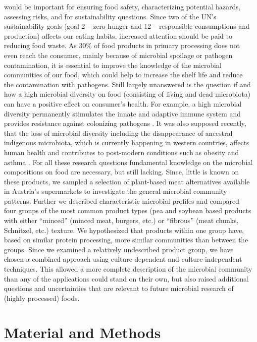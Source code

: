 \documentclass[preprint, 3p,
authoryear]{elsarticle} %
\begin{document}
would be important for ensuring food safety, characterizing potential
hazards, assessing risks, and for sustainability questions. Since two of
the UN's sustainability goals (goal 2 -- zero hunger and 12 --
responsible consumptions and production) affects our eating habits,
increased attention should be paid to reducing food waste. As 30\% of
food products in primary processing does not even reach the consumer,
mainly because of microbial spoilage or pathogen contamination, it is
essential to improve the knowledge of the microbial communities of our
food, which could help to increase the shelf life and reduce the
contamination with pathogens. Still largely unanswered is the question
if and how a high microbial diversity on food (consisting of living and
dead microbiota) can have a positive effect on consumer's health. For
example, a high microbial diversity permanently stimulates the innate
and adaptive immune system and provides resistance against colonizing
pathogens \citep[\citet{Mackowiak.1982},
\citet{Smith.2007}]{Crowe.1973}. It was also supposed recently, that the
loss of microbial diversity including the disappearance of ancestral
indigenous microbiota, which is currently happening in western
countries, affects human health and contributes to post-modern
conditions such as obesity and asthma \citep{Blaser.2009, Vangay.2018}.
For all these research questions fundamental knowledge on the microbial
compositions on food are necessary, but still lacking. Since, little is
known on these products, we sampled a selection of plant-based meat
alternatives available in Austria's supermarkets to investigate the
general microbial community patterns. Further we described
characteristic microbial profiles and compared four groups of the most
common product types (pea and soybean based products with either
``minced'' (minced meat, burgers, etc.) or ``fibrous'' (meat chunks,
Schnitzel, etc.) texture. We hypothesized that products within one group
have, based on similar protein processing, more similar communities than
between the groups. Since we examined a relatively undescribed product
group, we have chosen a combined approach using culture-dependent and
culture-independent techniques. This allowed a more complete description
of the microbial community than any of the applications could stand on
their own, but also raised additional questions and uncertainties that
are relevant to future microbial research of (highly processed) foods.

\hypertarget{material-and-methods}{%
\section{Material and Methods}\label{material-and-methods}}
\end{document}
